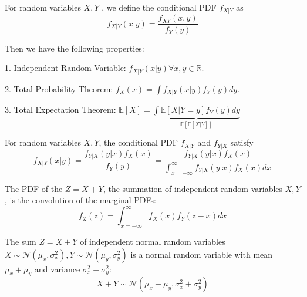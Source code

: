 \begin{definition}
    For random variables \(X, Y\) , we define the conditional PDF \(f_{X \vert Y}\) as 
    \[
        f_{X \vert Y}(x \vert y) = \dfrac{f_{XY}(x, y)}{f_Y(y)}
    \]
\end{definition}

Then we have the following properties: 

1. Independent Random Variable: \(f_{X \vert Y}(x \vert y) \forall x, y \in \mathbb{R}\). 

2. Total Probability Theorem: \(f_X(x) = \int f_{X \vert Y}(x \vert y) f_Y(y) dy\). 

3. Total Expectation Theorem: \(\mathbb{E}[X] = \underbrace{\int \mathbb{E}[X \vert Y = y] f_Y(y) dy}_{\mathbb{E}[\mathbb{E}[X \vert Y]]}\) 

\begin{theorem}
    For random variables \(X, Y\), the conditional PDF \(f_{X \vert Y}\) and \(f_{Y \vert X}\) satisfy 
    \[
        f_{X \vert Y} (x \vert y) = \dfrac{f_{Y \vert X}(y \vert x) f_X(x)}{f_Y(y)} = \dfrac{f_{Y \vert X}(y \vert x) f_X(x)}{\int_{x = -\infty}^{\infty} f_{Y \vert X}(y \vert x) f_X(x) dx}
    \]
\end{theorem}

\begin{theorem}
    The PDF of the \(Z = X + Y\), the summation of independent random variables \(X, Y\), is the convolution of the marginal PDFs: 
    \[
        f_Z(z) = \int_{x =-\infty}^{\infty} f_X(x) f_Y(z - x) dx
    \]
\end{theorem}

\begin{corollary}
    The sum \(Z = X + Y\) of independent normal random variables \(X \sim \mathcal{N} (\mu_x, \sigma_x^2), Y \sim \mathcal{N} (\mu_y, \sigma_y^2)\) is a normal random variable with mean \(\mu_x + \mu_y\) and variance \(\sigma_x^2 + \sigma_y^2\): 
    \[
        X + Y \sim \mathcal{N} (\mu_x + \mu_y, \sigma_x^2 + \sigma_y^2)
    \]  
\end{corollary}


